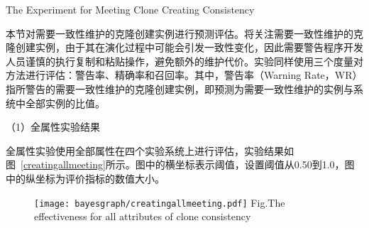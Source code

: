 
{The Experiment for Meeting Clone Creating Consistency}

本节对需要一致性维护的克隆创建实例进行预测评估。将关注需要一致性维护的克隆创建实例，由于其在演化过程中可能会引发一致性变化，因此需要警告程序开发人员谨慎的执行复制和粘贴操作，避免额外的维护代价。实验同样使用三个度量对方法进行评估：警告率、精确率和召回率。其中，警告率（Warning Rate，WR）指所警告的需要一致性维护的克隆创建实例，即预测为需要一致性维护的实例与系统中全部实例的比值。


（1）全属性实验结果

全属性实验使用全部属性在四个实验系统上进行评估，实验结果如图~\ref{creatingallmeeting}所示。图中的横坐标表示阈值，设置阈值从0.50到1.0，图中的纵坐标为评价指标的数值大小。

\begin{figure}[h]
\centering
\texttt{[image: bayesgraph/creatingallmeeting.pdf]}
{Fig.$\!$}{The effectiveness for all attributes of clone consistency}
\vspace{-1em}
\end{figure}

